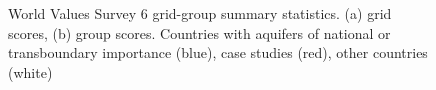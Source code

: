 \documentclass[12pt, a4paper]{article}
\begin{document}
\newpage


\begin{figure}
	\caption{World Values Survey 6 grid-group summary statistics. (a) grid scores, (b) group scores. Countries with aquifers of national or transboundary importance (blue), case studies (red), other countries (white)} \label{Fig: CH3_GCGP1_WVS raw stats all countries boxplots}
	\begin{center}
	\end{center}
\end{figure}
\end{document}
